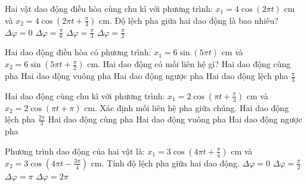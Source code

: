 \begin{ex}
Hai vật dao động điều hòa cùng chu kì với phương trình: $x_1 = 4\cos(2\pi t)$ cm và $x_2 = 4\cos(2\pi t + \frac{\pi}{3})$ cm. Độ lệch pha giữa hai dao động là bao nhiêu?
\choice
{$\Delta\varphi = 0$}
{$\Delta\varphi = \frac{\pi}{6}$}
{\True $\Delta\varphi = \frac{\pi}{3}$}
{$\Delta\varphi = \frac{\pi}{2}$}
\end{ex}

\begin{ex}
Hai dao động điều hòa có phương trình: $x_1 = 6\sin(5\pi t)$ cm và $x_2 = 6\sin(5\pi t + \frac{\pi}{2})$ cm. Hai dao động có mối liên hệ gì?
\choice
{Hai dao động cùng pha}
{\True Hai dao động vuông pha}
{Hai dao động ngược pha}
{Hai dao động lệch pha $\frac{\pi}{3}$}
\end{ex}

\begin{ex}
Hai dao động cùng chu kì với phương trình: $x_1 = 2\cos(\pi t + \frac{\pi}{3})$ cm và $x_2 = 2\cos(\pi t + \pi)$ cm. Xác định mối liên hệ pha giữa chúng.
\choice
{\True Hai dao động lệch pha $\frac{2\pi}{3}$}
{Hai dao động cùng pha}
{Hai dao động vuông pha}
{Hai dao động ngược pha}
\end{ex}

\begin{ex}
Phương trình dao động của hai vật là: $x_1 = 3\cos(4\pi t + \frac{\pi}{4})$ cm và $x_2 = 3\cos(4\pi t - \frac{3\pi}{4})$ cm. Tính độ lệch pha giữa hai dao động.
\choice
{$\Delta\varphi = 0$}
{$\Delta\varphi = \frac{\pi}{2}$}
{\True $\Delta\varphi = \pi$}
{$\Delta\varphi = 2\pi$}
\end{ex}

